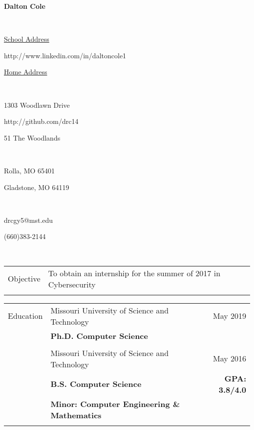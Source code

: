 \documentclass{article}
\newcommand\textbox[1]{%
  \parbox{.333\textwidth}{#1}%
}
\begin{document}

\noindent\textbox{\hfill}\textbox{\hfil \textbf{Dalton Cole}\hfil}\textbox{\hfill} \\
\noindent\textbox{\underline{School Address}\hfill}\textbox{\hfil http://www.linkedin.com/in/daltoncole1\hfil}\textbox{\hfill \underline{Home Address}} \\
\noindent\textbox{1303 Woodlawn Drive\hfill}\textbox{\hfil http://github.com/drc14\hfil}\textbox{\hfill 51 The Woodlands} \\
\noindent\textbox{Rolla, MO 65401\hfill}\textbox{\hfil \hfil}\textbox{\hfill Gladstone, MO 64119} \\
\noindent\textbox{drcgy5@mst.edu\hfill}\textbox{\hfil \hfil}\textbox{\hfill (660)383-2144} \\
\noindent\makebox[\linewidth]{\rule{\textwidth}{.4pt}} 

\begin{tabular}{p{1.5cm} p{12.9cm} r}
Objective  	& To obtain an internship for the summer of 2017 in Cybersecurity 	& 						\\ \\
\end{tabular}

\begin{tabular}{p{1.5cm} p{12.9cm} r}
Education  	& Missouri University of Science and Technology 					& May 2019 				\\
			& \textbf{Ph.D. Computer Science} 									& 						\\ \\

		  	& Missouri University of Science and Technology 					& May 2016 				\\
			& \textbf{B.S. Computer Science} 									& \textbf{GPA: 3.8/4.0} \\
			& \textbf{Minor: Computer Engineering \& Mathematics} 										\\ \\
\end{tabular}
\end{document}
